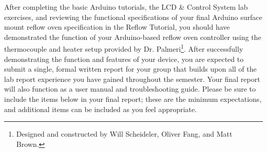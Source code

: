 \documentclass[10pt]{report}
\begin{document}
After completing the basic Arduino tutorials, the LCD \& Control System lab
exercises, and reviewing the functional specifications of your final Arduino
surface mount reflow oven specification in the Reflow Tutorial, you should have
demonstrated the function of your Arduino-based reflow oven controller using
the thermocouple and heater setup provided by Dr. Palmeri\footnote{Designed and
constructed by Will Scheideler, Oliver Fang, and Matt Brown.}.  After
successfully demonstrating the function and features of your device, you are
expected to submit a single, formal written report for your group that builds
upon all of the lab report experience you have gained throughout the semester.
Your final report will also function as a user manual and troubleshooting
guide.  Please be sure to include the items below in your final report; these
are the minimum expectations, and additional items can be included as you feel
appropriate.
\end{document}
